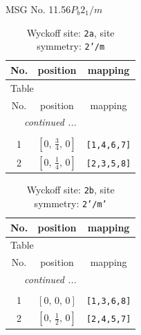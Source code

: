 \documentclass[fleqn,8pt]{jsarticle}
\begin{document}
\setcounter{MaxMatrixCols}{32}

\renewcommand{\tablename}{Table~}
\renewcommand{\figurename}{Figure~}
\begin{center}
\LARGE
MSG No. 11.56\quad$P_{b}2_{1}/m$
\end{center}
\renewcommand{\arraystretch}{1.2}
\begin{longtable}{ccc}
\caption{Wyckoff site: {\tt 2a}, site symmetry: {\tt 2'/m}}
 \\
 \hline \hline
No. & position & mapping \\ \hline \endfirsthead

\multicolumn{2}{l}{\tablename\ \thetable{}} \\
 \hline \hline
No. & position & mapping \\ \hline \endhead

 \hline \hline
\multicolumn{2}{r}{\footnotesize\it continued ...} \\ \endfoot

 \hline \hline
\multicolumn{2}{r}{} \\ \endlastfoot

1 & $\left[ 0,\, \frac{3}{4},\, 0 \right]$ & {\tt [1,4,6,7]} \\ \hline
2 & $\left[ 0,\, \frac{1}{4},\, 0 \right]$ & {\tt [2,3,5,8]} \\
\end{longtable}
\renewcommand{\arraystretch}{1.2}
\begin{longtable}{ccc}
\caption{Wyckoff site: {\tt 2b}, site symmetry: {\tt 2'/m'}}
 \\
 \hline \hline
No. & position & mapping \\ \hline \endfirsthead

\multicolumn{2}{l}{\tablename\ \thetable{}} \\
 \hline \hline
No. & position & mapping \\ \hline \endhead

 \hline \hline
\multicolumn{2}{r}{\footnotesize\it continued ...} \\ \endfoot

 \hline \hline
\multicolumn{2}{r}{} \\ \endlastfoot

1 & $\left[ 0,\, 0,\, 0 \right]$ & {\tt [1,3,6,8]} \\ \hline
2 & $\left[ 0,\, \frac{1}{2},\, 0 \right]$ & {\tt [2,4,5,7]} \\
\end{longtable}
\renewcommand{\arraystretch}{1.2}
\end{document}
